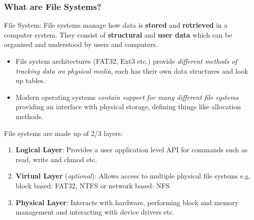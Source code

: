 \documentclass{beamer}
\begin{document}
\begin{frame}[allowframebreaks]
	\frametitle{What are File Systems?}
	\begin{block}{File System:}
		File systems manage how data is \textbf{stored} and \textbf{retrieved} in a computer system. They consist of \textbf{structural} and \textbf{user data} which can be organised and understood by users and computers.
	\end{block}
	
	\begin{itemize}
		\item File system architectures (FAT32, Ext3 etc.) provide \textit{different methods of tracking data on physical media}, each has their own data structures and look up tables. %
		\\
		
		\item Modern operating systems \textit{contain support for many different file systems} providing an interface with physical storage, defining things like allocation methods. 
	\end{itemize}
	
	\newpage
	File systems are made up of 2/3 layers:
	\begin{enumerate}
		\item\textbf{Logical Layer}: Provides a user application level API for commands such as read, write and chmod etc.
		\item\textbf{Virtual Layer} (\textit{optional}): Allows access to multiple physical file systems e.g. block based: FAT32, NTFS or network based: NFS
		\item\textbf{Physical Layer}: Interacts with hardware, performing block and memory management and interacting with device drivers etc.
	\end{enumerate}
	

\end{frame}
\end{document}
